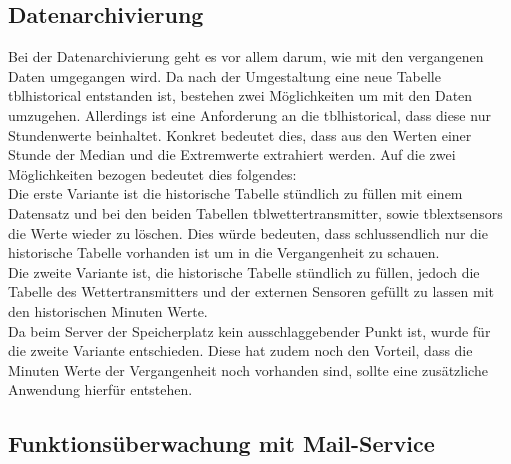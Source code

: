 \subsection{Datenarchivierung}

Bei der Datenarchivierung geht es vor allem darum, wie mit den vergangenen Daten umgegangen wird. Da nach der Umgestaltung eine neue Tabelle tblhistorical entstanden ist, bestehen zwei Möglichkeiten um mit den Daten umzugehen. Allerdings ist eine Anforderung an die tblhistorical, dass diese nur Stundenwerte beinhaltet. Konkret bedeutet dies, dass aus den Werten einer Stunde der Median und die Extremwerte extrahiert werden. Auf die zwei Möglichkeiten bezogen bedeutet dies folgendes: \\
Die erste Variante ist die historische Tabelle stündlich zu füllen mit einem Datensatz und bei den beiden Tabellen tblwettertransmitter, sowie tblextsensors die Werte wieder zu löschen. Dies würde bedeuten, dass schlussendlich nur die historische Tabelle vorhanden ist um in die Vergangenheit zu schauen.\\
Die zweite Variante ist, die historische Tabelle stündlich zu füllen, jedoch die Tabelle des Wettertransmitters und der externen Sensoren gefüllt zu lassen mit den historischen Minuten Werte.\\
Da beim Server der Speicherplatz kein ausschlaggebender Punkt ist, wurde für die zweite Variante entschieden. Diese hat zudem noch den Vorteil, dass die Minuten Werte der Vergangenheit noch vorhanden sind, sollte eine zusätzliche Anwendung hierfür entstehen.



\subsection{Funktionsüberwachung mit Mail-Service}


